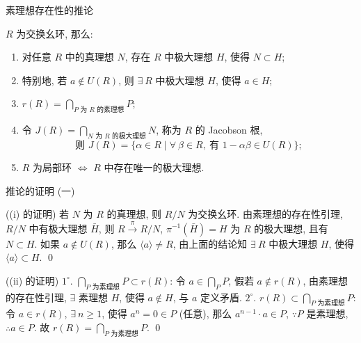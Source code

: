 \begin{frame}{素理想存在性的推论}

\begin{cor}
$R$ 为交换幺环, 那么:
\begin{enumerate}
\item[(i)] 对任意 $R$ 中的真理想 $N$, 存在 $R$ 中极大理想 $H$,
  使得 $N \subset H$;
\item[] \hspace{3em} 特别地, 若 $a \notin U(R)$,
  则 $\exists\ R$ 中极大理想 $H$, 使得 $a \in H$;
\item[(ii)] $\displaystyle r(R) = \bigcap_{P \text{ 为 } R \text{ 的素理想}} P$;
\item[(iii)] 令
  $\displaystyle J(R) = \bigcap_{N \text{ 为 } R \text{ 的极大理想}} N$,
  称为 $R$ 的 Jacobson 根,
  \[
  \text{则 } J(R) = \big\{ \alpha \in R \;\big|\; \forall\ \beta \in R,\
  \text{有 } 1 - \alpha \beta \in U(R) \big\};
  \]
\item[(iv)] $R$ 为局部环 $\iff$ $R$ 中存在唯一的极大理想.
\end{enumerate}
\end{cor}

\end{frame}


\begin{frame}{推论的证明 (一)}

\startproof[bg=yellow, fg=red]((i) 的证明)
若 $N$ 为 $R$ 的真理想, 则 $R/N$ 为交换幺环.
由素理想的存在性引理, $R/N$ 中有极大理想 $\bar{H}$, 则
$R \xrightarrow{\ \pi\ } R/N$,
$\pi^{-1}(\bar{H}) = H$ 为 $R$ 的极大理想, 且有 $N \subset H$.
\pause
如果 $a \notin U(R)$, 那么 $\langle a \rangle \neq R$,
由上面的结论知 $\exists\ R$ 中极大理想 $H$, 使得 $\langle a \rangle \subset H$.
\qed

\pause

\startproof[bg=yellow, fg=red]((ii) 的证明)
$1^{\circ}$. $\bigcap_{P \text{ 为素理想}} P \subset r(R)$:
令 $a \in \bigcap_P P$, 假若 $a \notin r(R)$, 由素理想的存在性引理,
$\exists$ 素理想 $H$, 使得 $a \notin H$, 与 $a$ 定义矛盾.
\pause
$2^{\circ}$. $r(R) \subset \bigcap_{P \text{ 为素理想}} P$:
令 $a \in r(R)$, $\exists\ n \geqslant 1$, 使得 $a^n = 0 \in P$ (任意),
那么 $a^{n-1} \cdot a \in P$, $\because P$ 是素理想,
$\therefore a \in P$.
故 $r(R) = \bigcap_{P \text{ 为素理想}} P$.
\qed

\end{frame}


